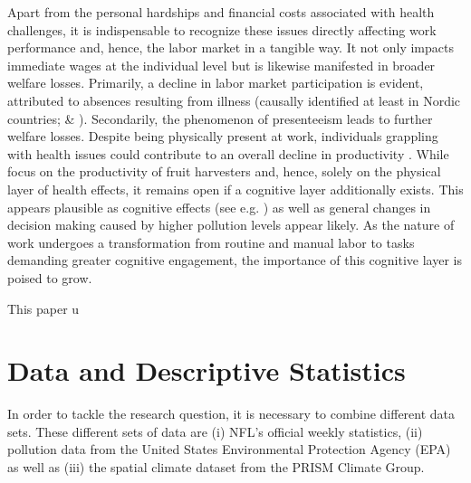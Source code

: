 \documentclass[12pt,a4paper]{article}
\begin{document}
Apart from the personal hardships and financial costs associated with health challenges, it is indispensable to recognize these issues directly affecting work performance and, hence, the labor market in a tangible way. It not only impacts immediate wages at the individual level but is likewise manifested in broader welfare losses. Primarily, a decline in labor market participation is evident, attributed to absences resulting from illness (causally identified at least in Nordic countries; \citealp{hansen2000} \& \citealp{jans2018}). Secondarily, the phenomenon of presenteeism leads to further welfare losses. Despite being physically present at work, individuals grappling with health issues could contribute to an overall decline in productivity \citep{zivin2012}. While \citet{zivin2012} focus on the productivity of fruit harvesters and, hence, solely on the physical layer of health effects, it remains open if a cognitive layer additionally exists. This appears plausible as cognitive effects (see e.g. \citealp{schikowski2015,tonne2014,ranft2009}) as well as general changes in decision making \citep{archsmith2018} caused by higher pollution levels appear likely. As the nature of work undergoes a transformation from routine and manual labor to tasks demanding greater cognitive engagement, the importance of this cognitive layer
is poised to grow.

This paper
\clearpage
u
\clearpage

\section{Data and Descriptive Statistics}
In order to tackle the research question, it is necessary to combine different data sets. These different sets of data are (i) NFL's official weekly statistics, (ii) pollution data from the United States Environmental Protection Agency (EPA) as well as (iii) the spatial climate dataset from the PRISM Climate Group. 
\end{document}
